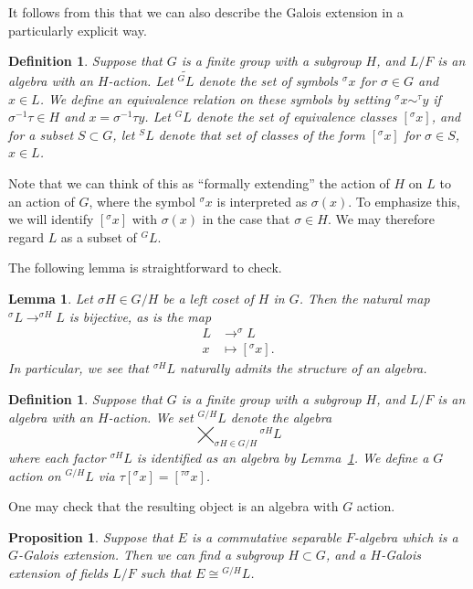 \documentclass[12pt]{report}
\theoremstyle{plain}
\newtheorem{defn}[thm]{Definition}
\newtheorem{lem}[thm]{Lemma}
\newtheorem{prop}[thm]{Proposition}
\newcommand{\til}{\widetilde}
\begin{document}
It follows from this that we can also describe the Galois extension in a
particularly explicit way.

\begin{defn}
Suppose that $G$ is a finite group with a subgroup $H$, and $L/F$ is an
algebra with an $H$-action. Let $\til{^G L}$ denote the set of symbols
$^\sigma x$ for $\sigma \in G$ and $x \in L$. We define an equivalence
relation on these symbols by setting $^\sigma x \sim ^\tau y$ if
$\sigma^{-1}\tau \in H$ and $x = \sigma^{-1} \tau y$. Let $^G L$ denote the
set of equivalence classes $[^\sigma x]$, and for a subset $S \subset G$,
let $^S L$ denote that set of classes of the form $[^\sigma x]$ for $\sigma
\in S$, $x \in L$.
\end{defn}

Note that we can think of this as ``formally extending'' the action of $H$
on $L$ to an action of $G$, where the symbol $^\sigma x$ is interpreted as
$\sigma(x)$. To emphasize this, we will identify $[^\sigma x]$
with $\sigma(x)$ in the case that $\sigma \in H$. We may therefore regard
$L$ as a subset of $^G L$.

The following lemma is straightforward to check.
\begin{lem} \label{induced factors}
Let $\sigma H \in G/H$ be a left coset of $H$ in $G$. Then the natural map
$^\sigma L \to ^{\sigma H} L$ is bijective, as is the map
\begin{align*}
L &\to ^\sigma L \\
x &\mapsto [^\sigma x].
\end{align*}
In particular, we see that $^{\sigma H} L$ naturally admits the structure
of an algebra.
\end{lem}


\begin{defn}
Suppose that $G$ is a finite group with a subgroup $H$, and $L/F$ is an
algebra with an $H$-action. We set $^{G/H} L$ denote the algebra
\[ \bigtimes_{\sigma H \in G/H} {} ^{\sigma H} L \]
where each factor $^{\sigma H} L$ is identified as an algebra by
Lemma~\ref{induced factors}. We define a $G$ action on $^{G/H} L$ via
$\tau [^\sigma x] = [^{\tau \sigma} x]$.
\end{defn}

One may check that the resulting object is an algebra with $G$ action.

\begin{prop}
Suppose that $E$ is a commutative separable $F$-algebra which is a
$G$-Galois extension. Then we can find a subgroup $H \subset G$, and a
$H$-Galois extension of fields $L/F$ such that
\(E \cong {^{G/H} L} \).
\end{prop}
\end{document}
